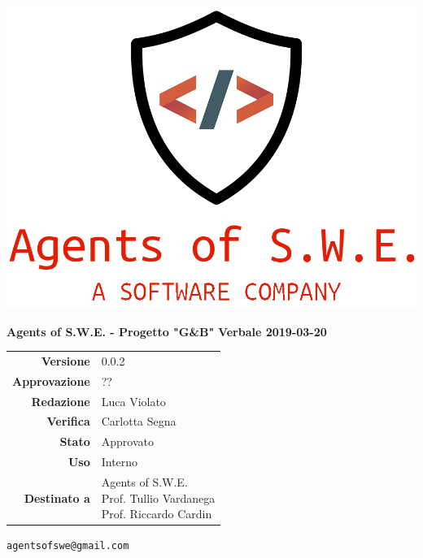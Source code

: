 


\begin{titlepage}
\thispagestyle{empty}

\begin{center}

\includegraphics[scale=0.3]{./images/logo.png} 




\large \textbf{Agents of S.W.E. - Progetto "G\&B"}
\vfill
\Huge \textbf{Verbale 2019-03-20}
\vfill
\large
\renewcommand{\arraystretch}{1.3}
\begin{tabular}{r|l}
\textbf{Versione} & 0.0.2\\
\textbf{Approvazione} & {??}\\
\textbf{Redazione} & \parbox[t]{5cm}{Luca Violato}\\
\textbf{Verifica} & \parbox[t]{5cm}{Carlotta Segna}\\
\textbf{Stato} & Approvato\\
\textbf{Uso} & Interno\\
\textbf{Destinato a} & \parbox[t]{5cm}{Agents of S.W.E. \\Prof. Tullio Vardanega\\Prof. Riccardo Cardin}
\end{tabular}
\vfill
\small
\texttt{agentsofswe@gmail.com}
\end{center}
\end{titlepage}

\pagebreak



\pagebreak


\pagebreak


\pagebreak


\pagebreak







